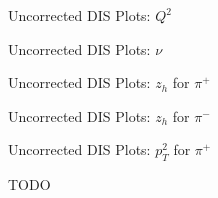 \begin{frame}{Uncorrected DIS Plots: $Q^2$}
    \label{20.10a::q2}

    \begin{figure}[t]
    \end{figure}

\end{frame}

\begin{frame}{Uncorrected DIS Plots: $\nu$}
    \label{20.10b::nu}

    \begin{figure}[t]
    \end{figure}

\end{frame}

\begin{frame}{Uncorrected DIS Plots: $z_h$ for $\pi^+$}
    \label{20.10c::zh_pi+}

    \begin{figure}[t]
    \end{figure}

\end{frame}

\begin{frame}{Uncorrected DIS Plots: $z_h$ for $\pi^-$}
    \label{20.10d::zh_pi-}

    \begin{figure}[t]
    \end{figure}

\end{frame}

\begin{frame}{Uncorrected DIS Plots: $p_T^2$ for $\pi^+$}
    \label{20.10e::pt2_pi+}

    TODO

\end{frame}

